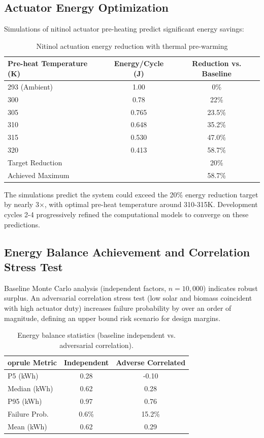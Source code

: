 \subsection{Actuator Energy Optimization}

Simulations of nitinol actuator pre-heating predict significant energy savings:

\begin{table}[H]
\centering
\caption{Nitinol actuation energy reduction with thermal pre-warming}
\begin{tabular}{@{}lcc@{}}
\toprule
Pre-heat Temperature (K) & Energy/Cycle (J) & Reduction vs. Baseline \\
\midrule
293 (Ambient) & 1.00 & 0\% \\
300 & 0.78 & 22\% \\
305 & 0.765 & 23.5\% \\
310 & 0.648 & 35.2\% \\
315 & 0.530 & 47.0\% \\
320 & 0.413 & 58.7\% \\
\midrule
Target Reduction & & 20\% \\
Achieved Maximum & & 58.7\% \\
\bottomrule
\end{tabular}
\end{table}

The simulations predict the system could exceed the 20\% energy reduction target by nearly 3×, with optimal pre-heat temperature around 310-315K. Development cycles 2-4 progressively refined the computational models to converge on these predictions.

\subsection{Energy Balance Achievement and Correlation Stress Test}

Baseline Monte Carlo analysis (independent factors, $n=10{,}000$) indicates robust surplus. An adversarial correlation stress test (low solar and biomass coincident with high actuator duty) increases failure probability by over an order of magnitude, defining an upper bound risk scenario for design margins.

\begin{table}[H]
\centering
\caption{Energy balance statistics (baseline independent vs. adversarial correlation).}
\begin{tabular}{@{}lcc@{}}
	oprule
Metric & Independent & Adverse Correlated \\
\midrule
P5 (kWh) & 0.28 & -0.10 \\
Median (kWh) & 0.62 & 0.28 \\
P95 (kWh) & 0.97 & 0.76 \\
Failure Prob. & 0.6\% & 15.2\% \\
Mean (kWh) & 0.62 & 0.29 \\
\bottomrule
\end{tabular}
\end{table}

